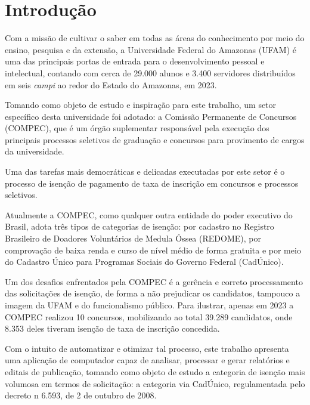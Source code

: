 \documentclass[
	12pt,			%
	openright,		%
	oneside,	
	a4paper,		%
	english,		%
	brazil			%
]{abntex2/abntex2}  %
\begin{document}

\tableofcontents*
\cleardoublepage

\textual

\chapter{Introdução}
	
	Com a missão de cultivar o saber em todas as áreas do conhecimento por meio do ensino, pesquisa e da extensão, a Universidade Federal do Amazonas (UFAM) é uma das principais
	portas de entrada para o desenvolvimento pessoal e intelectual, contando com cerca de 29.000 alunos e 3.400 servidores distribuídos em seis \textit{campi} ao redor do Estado do Amazonas, em 2023.
	
	Tomando como objeto de estudo e inspiração para este trabalho, um setor específico desta universidade foi adotado: a Comissão Permanente de Concursos (COMPEC), que é um órgão
	suplementar responsável pela execução dos principais processos seletivos de graduação e concursos para provimento de cargos da universidade.
	
	Uma das tarefas mais democráticas e delicadas executadas por este setor é o processo de isenção de pagamento de taxa de inscrição em concursos e processos seletivos.
	
	Atualmente a COMPEC, como qualquer outra entidade do poder executivo do Brasil, adota três tipos de categorias de isenção: por cadastro no Registro Brasileiro de Doadores Voluntários de Medula Óssea (REDOME), por comprovação de baixa renda e curso de nível médio de forma gratuita e por meio do Cadastro Único para Programas Sociais do Governo Federal (CadÚnico).
	
	Um dos desafios enfrentados pela COMPEC é a gerência e correto processamento das solicitações de isenção, de forma a não prejudicar os candidatos, tampouco a imagem da UFAM e do funcionalismo público. Para ilustrar, apenas em 2023 a COMPEC realizou 10 concursos, mobilizando ao total 39.289 candidatos, onde 8.353 deles tiveram isenção de taxa de inscrição concedida.
	
	Com o intuito de automatizar e otimizar tal processo, este trabalho apresenta uma aplicação de computador capaz de analisar, processar e gerar relatórios e editais de publicação, tomando como objeto de estudo a categoria de isenção mais volumosa em termos de solicitação: a categoria via CadÚnico, regulamentada pelo decreto n{\textdegree} 6.593, de 2 de outubro de 2008.
	
\end{document}
